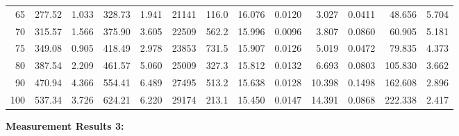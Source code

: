 \documentclass[10pt]{article}
\begin{document}
{\begin{tabular}{|r|rr|rr|rr|rr|rr|r|r|}
       65 &       277.52 &        1.033 &       328.73 &        1.941 &        21141 &        116.0 &       16.076 &       0.0120 &        3.027 &       0.0411 &       48.656 &        5.704 \\
       70 &       315.57 &        1.566 &       375.90 &        3.605 &        22509 &        562.2 &       15.996 &       0.0096 &        3.807 &       0.0860 &       60.905 &        5.181 \\
       75 &       349.08 &        0.905 &       418.49 &        2.978 &        23853 &        731.5 &       15.907 &       0.0126 &        5.019 &       0.0472 &       79.835 &        4.373 \\
       80 &       387.54 &        2.209 &       461.57 &        5.060 &        25009 &        327.3 &       15.812 &       0.0132 &        6.693 &       0.0803 &      105.830 &        3.662 \\
       90 &       470.94 &        4.366 &       554.41 &        6.489 &        27495 &        513.2 &       15.638 &       0.0128 &       10.398 &       0.1498 &      162.608 &        2.896 \\
      100 &       537.34 &        3.726 &       624.21 &        6.220 &        29174 &        213.1 &       15.450 &       0.0147 &       14.391 &       0.0868 &      222.338 &        2.417 \\
\hline
\end{tabular}
}

\vspace{3mm}

\noindent
{\large \bf Measurement Results 3:}
\vspace{3mm}
\end{document}
